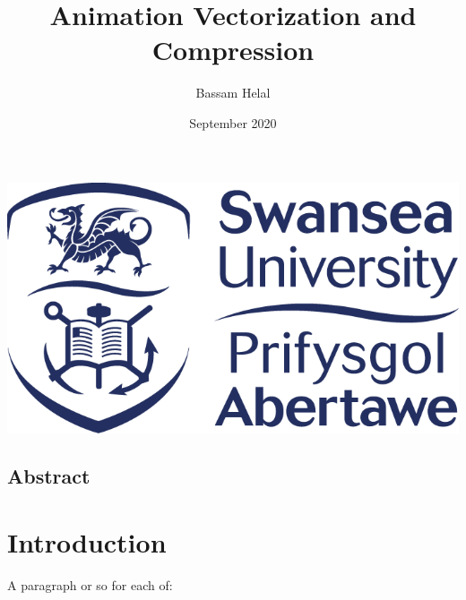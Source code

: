 \documentclass[12pt]{article}
\title{Animation Vectorization and Compression}
\author{Bassam Helal}
\date{ September 2020 }
\begin{document}
    \pagecolor{black}
    \color{white}


    \maketitle

    \begin{center}
        \vspace{8cm}
        \includegraphics[scale=0.65]{SwanseaUniversityLogo.png}
    \end{center}

    \pagebreak

    \begin{center}
        \section*{Abstract}
    \end{center}


    \pagebreak

    \renewcommand*\contentsname{
    \begin{center}
        Table of Contents
    \end{center}}

    \tableofcontents

    \pagebreak



    \section{Introduction}

    A paragraph or so for each of:
\end{document}

